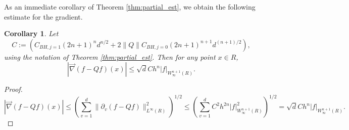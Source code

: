 \documentclass[10pt]{article}
\newtheorem{corollary}[theorem]{Corollary}
\theoremstyle{definition}
\numberwithin{equation}{section}
\numberwithin{figure}{section}
\numberwithin{table}{section}
\begin{document}

As an immediate corollary of Theorem \ref{thm:partial_est}, we obtain the following estimate for the gradient.

\begin{corollary}
Let $$C:=(C_{BH,j=1}(2n+1)^nd^{n/2}+2\|Q\|C_{BH,j=0}(2n+1)^{n+1}d^{(n+1)/2}),$$ using the notation of Theorem \ref{thm:partial_est}. Then for any point $x\in R$,
$$|\vec{\nabla}(f-Qf)(x)|\leq\sqrt{d}Ch^n|f|_{W^{n+1}_\infty(R)}.$$
\label{cor:gradient_est}
\end{corollary}
\begin{proof}
$$|\vec{\nabla}(f-Qf)(x)|\leq \left(\sum_{v=1}^d\|\partial_v(f-Qf)\|_{L^\infty(R)}^2\right)^{1/2}\leq \left(\sum_{v=1}^dC^2h^{2n}|f|^2_{W^{n+1}_\infty(R)}\right)^{1/2}=\sqrt{d}Ch^n|f|_{W^{n+1}_\infty(R)}.$$
\end{proof}
\end{document}
